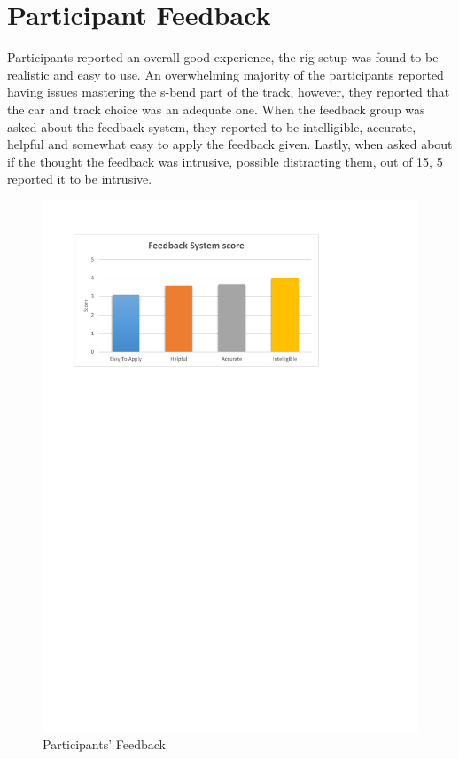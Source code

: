 \section{Participant Feedback}
\label{sec:eval-usersFeedback}
Participants reported an overall good experience, the rig setup was found to be realistic and easy to use. An overwhelming majority of the participants reported having issues mastering the s-bend part of the track, however, they reported that the car and track choice was an adequate one. When the feedback group was asked about the feedback system, they reported to be intelligible, accurate, helpful and somewhat easy to apply the feedback given. Lastly, when asked about if the thought the feedback was intrusive, possible distracting them, out of 15, 5 reported it to be intrusive.

\begin{figure}[!htb]
	\centering
	\includegraphics[width=\textwidth]{charts/feedbacksystemfeedback.pdf}
	\caption[Participants' Feedback]{Participants' Feedback}
	\label{fig:chart-feedbacksystemfeedback}
\end{figure}


